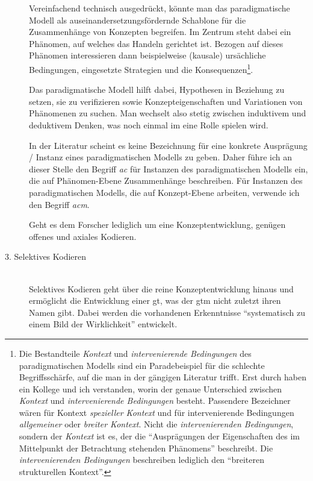 \begin{description}
  Vereinfachend technisch ausgedrückt, könnte man das paradigmatische Modell als auseinandersetzungsfördernde Schablone für die Zusammenhänge von Konzepten begreifen. Im Zentrum steht dabei ein Phänomen, auf welches das Handeln gerichtet ist. Bezogen auf dieses Phänomen interessieren dann beispielweise (kausale) ursächliche Bedingungen, eingesetzte Strategien und die Konsequenzen\footnote{Die Bestandteile \textit{Kontext} und \textit{intervenierende Bedingungen} des paradigmatischen Modells sind ein Paradebeispiel für die schlechte Begriffsschärfe, auf die man in der gängigen Literatur trifft. Erst durch \cite{Salinger:2013vd} haben ein Kollege und ich verstanden, worin der genaue Unterschied zwischen \textit{Kontext} und \textit{intervenierende Bedingungen} besteht. Passendere Bezeichner wären für Kontext \textit{spezieller Kontext} und für intervenierende Bedingungen \textit{allgemeiner} oder \textit{breiter Kontext}. Nicht die \textit{intervenierenden Bedingungen}, sondern der \textit{Kontext} ist es, der die ``Ausprägungen der Eigenschaften des im Mittelpunkt der Betrachtung stehenden Phänomens'' beschreibt. Die \textit{intervenierenden Bedingungen} beschreiben lediglich den ``breiteren strukturellen Kontext''.}.
  
  Das paradigmatische Modell hilft dabei, Hypothesen in Beziehung zu setzen, sie zu verifizieren sowie Konzepteigenschaften und Variationen von Phänomenen zu suchen. Man wechselt also stetig zwischen induktivem und deduktivem Denken, was noch einmal im  eine Rolle spielen wird.
  
  In der Literatur scheint es keine Bezeichnung für eine konkrete Ausprägung / Instanz eines paradigmatischen Modells zu geben. Daher führe ich an dieser Stelle den Begriff \textit{\gls{ac}} für Instanzen des paradigmatischen Modells ein, die auf Phänomen-Ebene Zusammenhänge beschreiben. Für Instanzen des paradigmatischen Modells, die auf Konzept-Ebene arbeiten, verwende ich den Begriff \textit{\gls{acm}}.
  
  Geht es dem Forscher lediglich um eine Konzeptentwicklung, genügen offenes und axiales Kodieren.
  
  \item[3. Selektives Kodieren] \hfill \\
  Selektives Kodieren geht über die reine Konzeptentwicklung hinaus und ermöglicht die Entwicklung einer \gls{gt}, was der \gls{gtm} nicht zuletzt ihren Namen gibt. Dabei werden die vorhandenen Erkenntnisse ``systematisch zu einem Bild der Wirklichkeit'' entwickelt.
  

\end{description}
